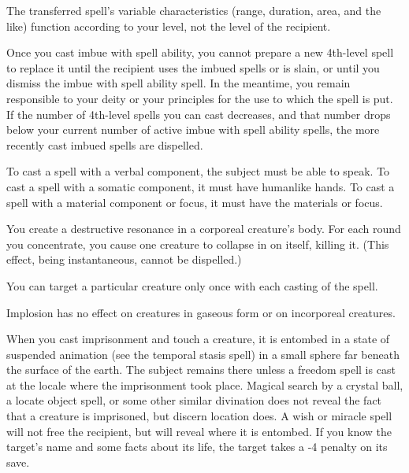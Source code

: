 \begin{multicols}{2}
\begin{small}
\smallskip\noindent The transferred spell's variable characteristics (range, duration, area, and the like) function according to your level, not the level of the recipient.

\smallskip\noindent Once you cast imbue with spell ability, you cannot prepare a new 4th-level spell to replace it until the recipient uses the imbued spells or is slain, or until you dismiss the imbue with spell ability spell. In the meantime, you remain responsible to your deity or your principles for the use to which the spell is put. If the number of 4th-level spells you can cast decreases, and that number drops below your current number of active imbue with spell ability spells, the more recently cast imbued spells are dispelled.

\smallskip\noindent To cast a spell with a verbal component, the subject must be able to speak. To cast a spell with a somatic component, it must have humanlike hands. To cast a spell with a material component or focus, it must have the materials or focus.

\noindent You create a destructive resonance in a corporeal creature's body. For each round you concentrate, you cause one creature to collapse in on itself, killing it. (This effect, being instantaneous, cannot be dispelled.)

\smallskip\noindent You can target a particular creature only once with each casting of the spell.

\smallskip\noindent Implosion has no effect on creatures in gaseous form or on incorporeal creatures.

\noindent When you cast imprisonment and touch a creature, it is entombed in a state of suspended animation (see the temporal stasis spell) in a small sphere far beneath the surface of the earth. The subject remains there unless a freedom spell is cast at the locale where the imprisonment took place. Magical search by a crystal ball, a locate object spell, or some other similar divination does not reveal the fact that a creature is imprisoned, but discern location does. A wish or miracle spell will not free the recipient, but will reveal where it is entombed. If you know the target's name and some facts about its life, the target takes a -4 penalty on its save.


\end{small}
\end{multicols}
